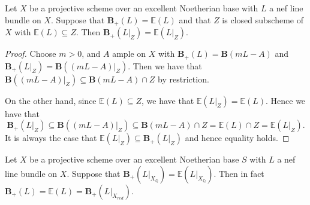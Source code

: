\documentclass[a4paper,12pt]{book}
\newcommand{\BB}{\mathbf{B}}
\newcommand{\BS}{\mathbf{B}_{+}}
\begin{document}
\begin{lemma}\label{red-eq}
	
	Let $X$ be a projective scheme over an excellent Noetherian base with $L$ a nef line bundle on $X$. Suppose that $\BS(L)=\mathbb{E}(L)$ and that $Z$ is closed subscheme of $X$ with $\mathbb{E}(L) \subseteq Z$. Then $\BS(L|_{Z})=\mathbb{E}(L|_{Z})$.
	
\end{lemma}

\begin{proof}
	
	Choose $m> 0$, and $A$ ample on $X$ with $\BS(L)=\BB(mL-A)$ and $\BS(L|_{Z})=\BB((mL-A)|_{Z})$. Then we have that $\BB((mL-A)|_{Z}) \subseteq \BB(mL-A)\cap Z$ by restriction.
	
	On the other hand, since $\mathbb{E}(L) \subseteq Z$, we have that $\mathbb{E}(L|_{Z}) = \mathbb{E}(L)$. Hence we have that $$\BS(L|_{Z})\subseteq \BB((mL-A)|_{Z})\subseteq \BB(mL-A)\cap Z =\mathbb{E}(L) \cap Z =\mathbb{E}(L|_{Z}).$$
	It is always the case that $\mathbb{E}(L|_{Z}) \subseteq \BS(L|_{Z})$ and hence equality holds.
	
	
\end{proof}


\begin{theorem}\label{ext}
	
	Let $X$ be a projective scheme over an excellent Noetherian base $S$ with $L$ a nef line bundle on $X$. Suppose that $\BS(L|_{X_{\mathbb{Q}}})=\mathbb{E}(L|_{X_{\mathbb{Q}}})$. Then in fact $\BS(L)=\mathbb{E}(L)=\BS(L|_{X_{red}})$.
	
\end{theorem}
\end{document}
